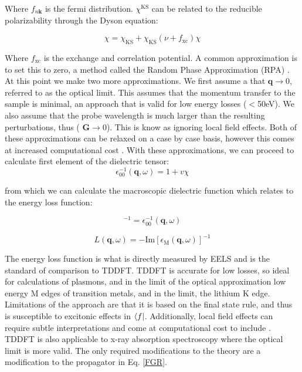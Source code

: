Where $f_{n\textbf{k}}$ is the fermi distribution.  $\chi^{\mathrm{KS}}$ can be related to the reducible polarizability through the Dyson equation:  

\begin{equation}
\chi = \chi_{\mathrm{KS}} + \chi_{\mathrm{KS}}(\nu + f_{\mathrm{xc}})\chi
\end{equation}

Where $f_{\mathrm{xc}}$ is the exchange and correlation potential.  A common approximation is to set this to zero, a method called the Random Phase Approximation (RPA) \cite{optic}.  At this point we make two more approximations.  We first assume a that $\textbf{q} \to 0$, referred to as the optical limit.  This assumes that the momentum transfer to the sample is minimal, an approach that is valid for low energy losses ($<$50eV).  We also assume that the probe wavelength is much larger than the resulting perturbations, thus ($\textbf{ G} \to 0$). This is know as ignoring local field effects.  Both of these approximations can be relaxed on a case by case basis, however this comes at increased computational cost \cite{exciting}. With these approximations, we can proceed to calculate first element of the dielectric tensor: 
\begin{equation}
\epsilon_{\mathrm{00}}^{-1} (\textbf{q},\omega) =1+v \chi
\end{equation}

from which we can calculate the macroscopic dielectric function which relates to the energy loss function: 

\begin{equation}
[\epsilon_{\mathrm{M}}(\textbf{q}\omega)]^{-1} = \epsilon_{\mathrm{00}}^{-1}(\textbf{q},\omega)
\end{equation}

\begin{equation}
	L(\textbf{q},\omega) = -\mathrm{Im}[\epsilon_{\mathrm{M}}(\textbf{q},\omega)]^{-1}
\end{equation}

The energy loss function is what is directly measured by EELS and is the standard of comparison to TDDFT. TDDFT is accurate for low losses, so ideal for calculations of plasmons, and in the limit of the optical approximation low energy M edges of transition metals, and in the limit, the lithium K edge.  Limitations of the approach are that it is based on the final state rule, and thus is susceptible to excitonic effects in $\bra{f}$.  Additionally, local field effects can require subtle interpretations and come at computational cost to include \cite{mauchamp_local_2008}.    TDDFT is also applicable to x-ray absorption spectroscopy where the optical limit is more valid.  The only required modifications to the theory are a modification to the propagator in Eq. \ref{FGR}.



